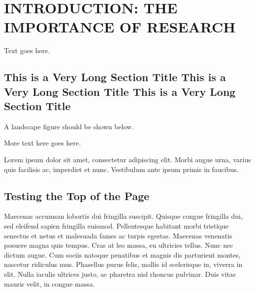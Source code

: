 %
%
%



\pagestyle{plain} %
\setcounter{page}{1}


\chapter{\uppercase {Introduction: The Importance of Research}}


Text goes here.

\section{This is a Very Long Section Title This is a Very Long Section Title This is a Very Long Section Title }

A landscape figure should be shown below. 

More text here goes here.


Lorem ipsum dolor sit amet, consectetur adipiscing elit. Morbi augue urna, varius quis facilisis ac, imperdiet et nunc. Vestibulum ante ipsum primis in faucibus. 

\section{Testing the Top of the Page}
Maecenas accumsan lobortis dui fringilla suscipit. Quisque congue fringilla dui, sed eleifend sapien fringilla euismod. Pellentesque habitant morbi tristique senectus et netus et malesuada fames ac turpis egestas. Maecenas venenatis posuere magna quis tempus. Cras at leo massa, eu ultricies tellus. Nunc nec dictum augue. Cum sociis natoque penatibus et magnis dis parturient montes, nascetur ridiculus mus. Phasellus purus felis, mollis id scelerisque in, viverra in elit. Nulla iaculis ultrices justo, ac pharetra nisl rhoncus pulvinar. Duis vitae mauris velit, in congue massa.

